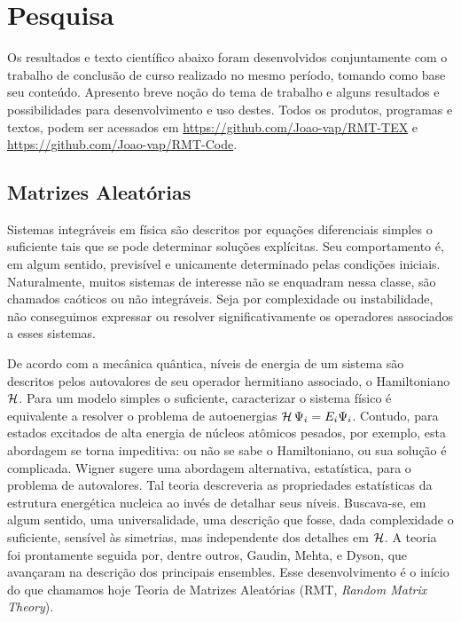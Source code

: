 \documentclass[12pt]{report}
\begin{document}
\section{Pesquisa}
\label{Pesquisa}

Os resultados e texto científico abaixo foram desenvolvidos conjuntamente com o trabalho de conclusão de curso realizado no mesmo período, tomando como base seu conteúdo. Apresento breve noção do tema de trabalho e alguns resultados e possibilidades para desenvolvimento e uso destes. Todos os produtos, programas e textos, podem ser acessados em \url{https://github.com/Joao-vap/RMT-TEX} e \url{https://github.com/Joao-vap/RMT-Code}.

\subsection{Matrizes Aleatórias}
\label{Section: Matrizes}

Sistemas integráveis em física são descritos por equações diferenciais simples o suficiente tais que se pode determinar soluções explícitas. Seu comportamento é, em algum sentido, previsível e unicamente determinado pelas condições iniciais. Naturalmente, muitos sistemas de interesse não se enquadram nessa classe, são chamados caóticos ou não integráveis. Seja por complexidade ou instabilidade, não conseguimos expressar ou resolver significativamente os operadores associados a esses sistemas. 

De acordo com a mecânica quântica, níveis de energia de um sistema são descritos pelos autovalores de seu operador hermitiano associado, o Hamiltoniano $\operatorname{\mathcal{H}}$. Para um modelo simples o suficiente, caracterizar o sistema físico é equivalente a resolver o problema de autoenergias $\operatorname{\mathcal{H}} \Psi_i = E_i \Psi_i$. Contudo, para estados excitados de alta energia de núcleos atômicos pesados, por exemplo, esta abordagem se torna impeditiva: ou não se sabe o Hamiltoniano, ou sua solução é complicada. Wigner sugere uma abordagem alternativa, estatística, para o problema de autovalores. Tal teoria descreveria as propriedades estatísticas da estrutura energética nucleica ao invés de detalhar seus níveis. Buscava-se, em algum sentido, uma universalidade, uma descrição que fosse, dada complexidade o suficiente, sensível às simetrias, mas independente dos detalhes em $\operatorname{\mathcal{H}}$. A teoria foi prontamente seguida por, dentre outros, Gaudin, Mehta, \cite{MehtaGaudin} e Dyson, \cite{Dyson} que avançaram na descrição dos principais ensembles. Esse desenvolvimento é o início do que chamamos hoje Teoria de Matrizes Aleatórias (RMT, \textit{Random Matrix Theory}).
\end{document}
